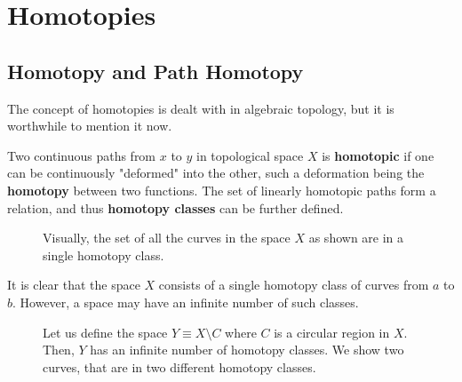 \section{Homotopies}  

\subsection{Homotopy and Path Homotopy}

  The concept of homotopies is dealt with in algebraic topology, but it is worthwhile to mention it now. 

  \begin{definition}[Homotopy]
    Two continuous paths from $x$ to $y$ in topological space $X$ is \textbf{homotopic} if one can be continuously "deformed" into the other, such a deformation being the \textbf{homotopy} between two functions. The set of linearly homotopic paths form a relation, and thus \textbf{homotopy classes} can be further defined. 
    \begin{figure}[H]
      \centering 
      \caption{Visually, the set of all the curves in the space $X$ as shown are in a single homotopy class.} 
      \label{fig:single_homotopy_class}
    \end{figure}
  \end{definition}

  It is clear that the space $X$ consists of a single homotopy class of curves from $a$ to $b$. However, a space may have an infinite number of such classes. 

  \begin{figure}[H]
    \centering 
    \caption{Let us define the space $Y \equiv X \setminus C$ where $C$ is a circular region in $X$. Then, $Y$ has an infinite number of homotopy classes. We show two curves, that are in two different homotopy classes. }
    \label{fig:homotopy_class}
  \end{figure}

